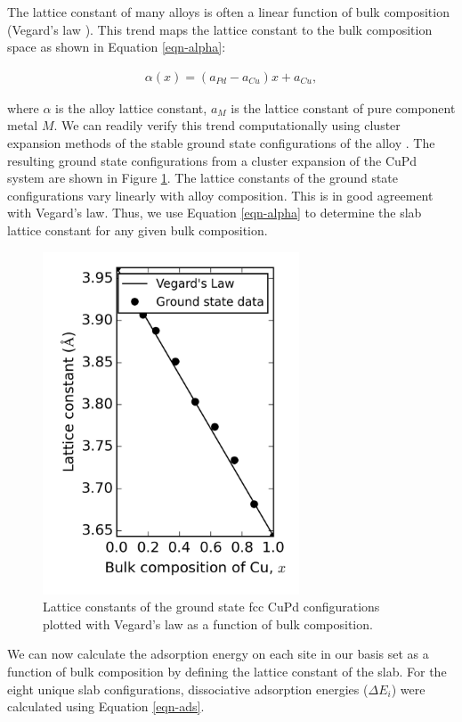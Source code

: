 \documentclass[12pt]{cmuthesis}
\begin{document}
The lattice constant of many alloys is often a linear function of bulk composition (Vegard's law \cite{denton-1991-vegar-law,bose-1992-elect-struc}). This trend  maps the lattice constant to the bulk composition space as shown in Equation \eqref{eqn-alpha}:

\begin{eqnarray}
\alpha(x) = (a_{Pd} - a_{Cu}) x + a_{Cu} \label{eqn-alpha},
\end{eqnarray}

\noindent
where \(\alpha\) is the alloy lattice constant, \(a_{M}\) is the lattice constant of pure component metal \(M\). We can readily verify this trend computationally using cluster expansion methods of the stable ground state configurations of the alloy \cite{walle-2002-self-monte,walle-2002-autom}. The resulting ground state configurations from a cluster expansion of the CuPd system are shown in Figure \ref{fig-vegard}. The lattice constants of the ground state configurations vary linearly with alloy composition. This is in good agreement with Vegard's law. Thus, we use Equation \eqref{eqn-alpha} to determine the slab lattice constant for any given bulk composition.

\begin{figure}[h]
\centering
\includegraphics[width=3in]{./images/vegard.png}
\caption{Lattice constants of the ground state fcc CuPd configurations plotted with Vegard's law as a function of bulk composition. \label{fig-vegard}}
\end{figure}

We can now calculate the adsorption energy on each site in our basis set as a function of bulk composition by defining the lattice constant of the slab. For the eight unique slab configurations, dissociative adsorption energies (\(\Delta E_{i}\)) were calculated using Equation \eqref{eqn-ads}.
\end{document}
